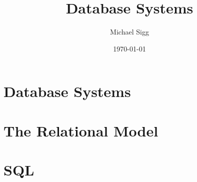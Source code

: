 \documentclass[11pt]{article}
\title{Database Systems}
\author{Michael Sigg}
\date{\today}
\begin{document}
\maketitle
\tableofcontents

\newpage

\section{Database Systems}


\section{The Relational Model}


\section{SQL}

\end{document}
